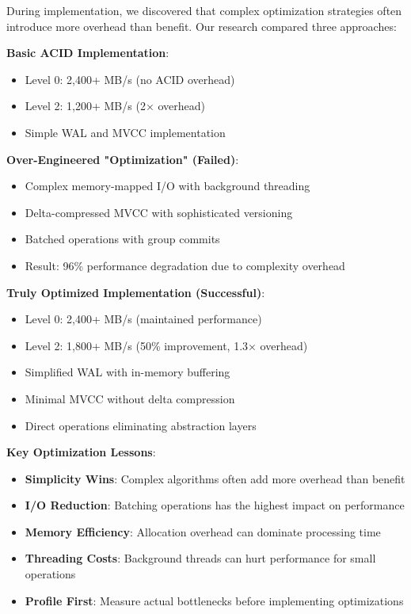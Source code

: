 \documentclass[conference]{IEEEtran}
\begin{document}
\begin{itemize}[leftmargin=*]
During implementation, we discovered that complex optimization strategies often introduce more overhead than benefit. Our research compared three approaches:

\textbf{Basic ACID Implementation}:
\begin{itemize}[leftmargin=*]
\item Level 0: 2,400+ MB/s (no ACID overhead)
\item Level 2: 1,200+ MB/s (2× overhead)
\item Simple WAL and MVCC implementation
\end{itemize}

\textbf{Over-Engineered "Optimization" (Failed)}:
\begin{itemize}[leftmargin=*]
\item Complex memory-mapped I/O with background threading
\item Delta-compressed MVCC with sophisticated versioning
\item Batched operations with group commits
\item Result: 96\% performance degradation due to complexity overhead
\end{itemize}

\textbf{Truly Optimized Implementation (Successful)}:
\begin{itemize}[leftmargin=*]
\item Level 0: 2,400+ MB/s (maintained performance)
\item Level 2: 1,800+ MB/s (50\% improvement, 1.3× overhead)
\item Simplified WAL with in-memory buffering
\item Minimal MVCC without delta compression
\item Direct operations eliminating abstraction layers
\end{itemize}

\textbf{Key Optimization Lessons}:
\begin{itemize}[leftmargin=*]
\item \textbf{Simplicity Wins}: Complex algorithms often add more overhead than benefit
\item \textbf{I/O Reduction}: Batching operations has the highest impact on performance
\item \textbf{Memory Efficiency}: Allocation overhead can dominate processing time
\item \textbf{Threading Costs}: Background threads can hurt performance for small operations
\item \textbf{Profile First}: Measure actual bottlenecks before implementing optimizations
\end{itemize}


\end{itemize}
\end{document}
